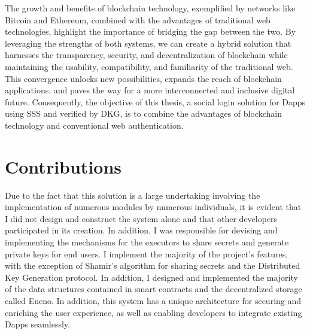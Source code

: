 \documentclass[../Main.tex]{subfiles}
\begin{document}
\indent The growth and benefits of blockchain technology, exemplified by networks like Bitcoin and Ethereum, combined with the advantages of traditional web technologies, highlight the importance of bridging the gap between the two. By leveraging the strengths of both systems, we can create a hybrid solution that harnesses the transparency, security, and decentralization of blockchain while maintaining the usability, compatibility, and familiarity of the traditional web. This convergence unlocks new possibilities, expands the reach of blockchain applications, and paves the way for a more interconnected and inclusive digital future. Consequently, the objective of this thesis, a social login solution for Dapps using SSS and verified by DKG, is to combine the advantages of blockchain technology and conventional web authentication.
\section{Contributions}
\label{section:1.2}
Due to the fact that this solution is a large undertaking involving the implementation of numerous modules by numerous individuals, it is evident that I did not design and construct the system alone and that other developers participated in its creation. In addition, I was responsible for devising and implementing the mechanisms for the executors to share secrets and generate private keys for end users. I implement the majority of the project's features, with the exception of Shamir's algorithm for sharing secrets and the Distributed Key Generation protocol. In addition, I designed and implemented the majority of the data structures contained in smart contracts and the decentralized storage called Eueno. In addition, this system has a unique architecture for securing and enriching the user experience, as well as enabling developers to integrate existing Dapps seamlessly.
\end{document}
